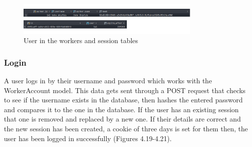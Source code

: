\begin{figure}[H]
    \caption{User in the workers and session tables}
    \label{image:userinDb}
    \centering
    \includegraphics[width=0.8\textwidth]{images/database/usr_In_db.png}
\end{figure}

\subsubsection{Login}
A user logs in by their username and password which works with the WorkerAccount model. This data gets sent through a POST request that checks to see if the username exists in the database, then hashes the entered password and compares it to the one in the database. If the user has an existing session that one is removed and replaced by a new one. If their details are correct and the new session has been created, a cookie of three days is set for them then, the user has been logged in successfully (Figures 4.19-4.21).

